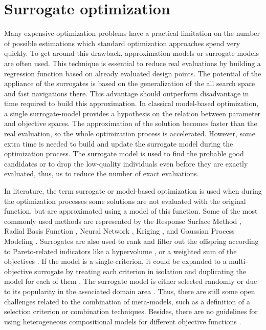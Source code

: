     \section{Surrogate optimization} 
        Many expensive optimization problems have a practical limitation on the number of possible estimations which standard optimization approaches spend very quickly. To get around this drawback, approximation models or surrogate models are often used. This technique is essential to reduce real evaluations by building a regression function based on already evaluated design points.
        The potential of the appliance of the surrogates is based on the generalization of the all search space and fast navigations there. This advantage should outperform disadvantage in time required to build this approximation. In classical model-based optimization, a single surrogate-model provides a hypothesis on the relation between parameter and objective spaces. The approximation of the solution becomes faster than the real evaluation, so the whole optimization process is accelerated. However, some extra time is needed to build and update the surrogate model during the optimization process. The surrogate model is used to find the probable good candidates or to drop the low-quality individuals even before they are exactly evaluated, thus, us to reduce the number of exact evaluations.

        In literature, the term surrogate or model-based optimization is used when during the optimization processes some solutions are not evaluated with the original function, but are approximated using a model of this function. Some of the most commonly used methods are represented by the Response Surface Method \cite{ResponseSurface}, Radial Basis Function \cite{Rasmussen2004}, Neural Network \cite{KOURAKOS201313}, Kriging \cite{Woodard00}, and Gaussian Process Modeling \cite{RasmussenN10, RasmussenW06}. Surrogates are also used to rank and filter out the offspring according to Pareto-related indicators like a hypervolume \cite{EmmerichGN06}, or a weighted sum of the objectives \cite{TaboadaBCW07}. If the model is a single-criterion, it could be expanded to a multi-objective surrogate by treating each criterion in isolation and duplicating the model for each of them \cite{Knowles06, nardi2019practical}. The surrogate model is either selected randomly or due to its popularity in the associated domain area \cite{SoftSurvey}. Thus, there are still some open challenges related to the combination of meta-models, such as a definition of a selection criterion or combination techniques. Besides, there are no guidelines for using heterogeneous compositional models for different objective functions \cite{SoftSurvey}.

